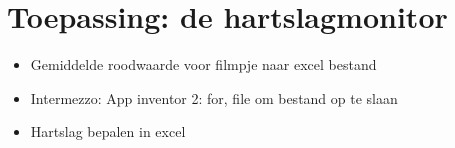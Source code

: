 \section{Toepassing: de hartslagmonitor}
\label{sec:Mod3_Sec3}
%

\begin{itemize}
	\item Gemiddelde roodwaarde voor filmpje naar excel bestand
	\item Intermezzo: App inventor 2: for, file om bestand op te slaan
	\item Hartslag bepalen in excel
\end{itemize}

